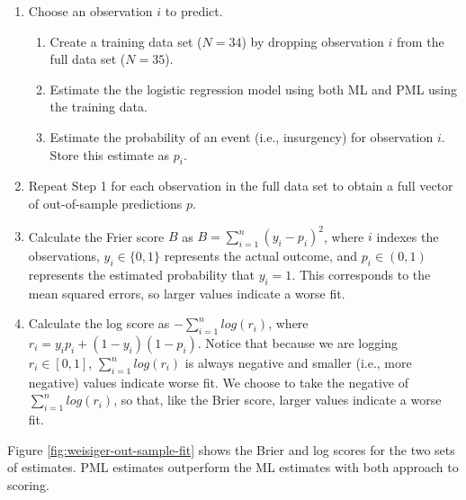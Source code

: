 \documentclass[12pt]{article}
\begin{document}
\begin{enumerate}
\item Choose an observation $i$ to predict.
	\begin{enumerate}
	\item Create a training data set ($N = 34$) by dropping observation $i$ from the full data set ($N = 35$).
	\item Estimate the the logistic regression model using both ML and PML using the training data.
	\item Estimate the probability of an event (i.e., insurgency) for observation $i$. Store this estimate as $p_i$.
	\end{enumerate}
\item Repeat Step 1 for each observation in the full data set to obtain a full vector of out-of-sample predictions $p$.
\item Calculate the Frier score $B$ as $B = \sum_{i = 1}^n (y_i - p_i)^2$, where $i$ indexes the observations, $y_i \in \{0, 1\}$ represents the actual outcome, and $p_i \in (0, 1)$ represents the estimated probability that $y_i = 1$. This corresponds to the mean squared errors, so larger values indicate a worse fit.
\item Calculate the log score as $-\sum_{i = 1}^n log(r_i)$, where $r_i = y_i p_i + (1 - y_i)(1 - p_i)$. Notice that because we are logging $r_i \in [0, 1]$, $\sum_{i = 1}^n log(r_i)$ is always negative and smaller (i.e., more negative) values indicate worse fit. We choose to take the negative of $\sum_{i = 1}^n log(r_i)$, so that, like the Brier score, larger values indicate a worse fit.
\end{enumerate}

\noindent Figure \ref{fig:weisiger-out-sample-fit} shows the Brier and log scores for the two sets of estimates. PML estimates outperform the ML estimates with both approach to scoring.
\end{document}
